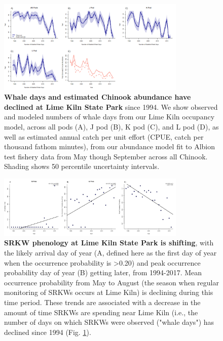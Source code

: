 \documentclass{article}
\begin{document}
\begin{figure}[!hp]
\includegraphics[width=0.8\textwidth]{../analyses/orcaphen/figures/modwhaledays_lime.png} 
\caption{\textbf{Whale days and estimated Chinook abundance have declined at Lime Kiln State Park} since 1994. We show observed and modeled numbers of whale days from our Lime Kiln occupancy model, across all pods (A), J pod (B), K pod (C), and L pod (D), as well as estimated annual catch per unit effort (CPUE, catch per thousand fathom minutes), from our abundance model fit to Albion test fishery data from May though September across all Chinook. Shading shows 50 percentile uncertainty intervals.}
\label{fig:mlimewdays}
\end{figure}
\begin{figure}[!hp]
\includegraphics[width=0.8\textwidth]{../analyses/orcaphen/figures/phentrends_lime_peak.png} 
\caption{\textbf{SRKW phenology at Lime Kiln State Park is shifting}, with the likely arrival day of year (A, defined here as the first day of year when the occurrence probability is >0.20) and peak occurrence probability day of year (B) getting later, from 1994-2017. Mean occurrence probability from May to August (the season when regular monitoring of SRKWs occurs at Lime Kiln) is declining during this time period. These trends are associated with a decrease in the amount of time SRKWs are spending near Lime Kiln (i.e., the number of days on which SRKWs were observed ("whale days") has declined since 1994 (Fig. \ref{fig:mlimewdays}).}
\label{fig:limetime}
\end{figure}
\end{document}
